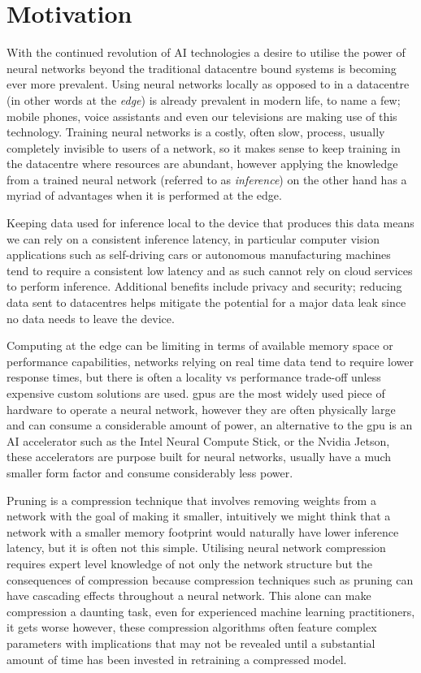 \documentclass[../Dissertation.tex]{subfiles}
\begin{document}
\section{Motivation}
With the continued revolution of AI technologies a desire to utilise the power of neural networks beyond the traditional datacentre bound systems is becoming ever more prevalent.
Using neural networks locally as opposed to in a datacentre (in other words at the \emph{edge}) is already prevalent in modern life, to name a few; mobile phones, voice assistants and even our televisions are making use of this technology. 
Training neural networks is a costly, often slow, process, usually completely invisible to users of a network, so it makes sense to keep training in the datacentre where resources are abundant, however applying the knowledge from a trained neural network (referred to as \emph{inference}) on the other hand has a myriad of advantages when it is performed at the edge.

Keeping data used for inference local to the device that produces this data means we can rely on a consistent inference latency, in particular computer vision applications such as self-driving cars or autonomous manufacturing machines tend to require a consistent low latency and as such cannot rely on cloud services to perform inference. 
Additional benefits include privacy and security; reducing data sent to datacentres helps mitigate the potential for a major data leak since no data needs to leave the device.

Computing at the edge can be limiting in terms of available memory space or performance capabilities, networks relying on real time data tend to require lower response times, but there is often a locality vs performance trade-off unless expensive custom solutions are used.
\acrshort{gpu}s are the most widely used piece of hardware to operate a neural network, however they are often physically large and can consume a considerable amount of power, an alternative to the \acrshort{gpu} is an AI accelerator such as the Intel Neural Compute Stick, or the Nvidia Jetson, these accelerators are purpose built for neural networks, usually have a much smaller form factor and consume considerably less power.

Pruning is a compression technique that involves removing weights from a network with the goal of making it smaller, intuitively we might think that a network with a smaller memory footprint would naturally have lower inference latency, but it is often not this simple.
Utilising neural network compression requires expert level knowledge of not only the network structure but the consequences of compression because compression techniques such as pruning can have cascading effects throughout a neural network.
This alone can make compression a daunting task, even for experienced machine learning practitioners, it gets worse however, these compression algorithms often feature complex parameters with implications that may not be revealed until a substantial amount of time has been invested in retraining a compressed model.
\end{document}
